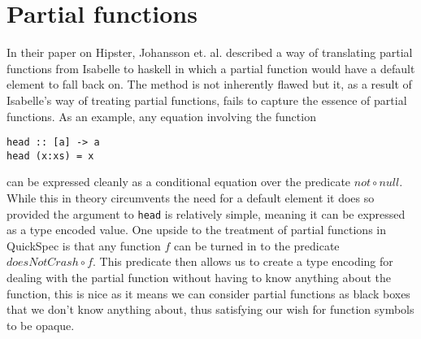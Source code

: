 \section{Partial functions}
In their paper on Hipster, Johansson et. al. \cite{Johansson2014}
described a way of translating partial functions from
Isabelle to haskell in which a partial function would
have a default element to fall back on. The method is
not inherently flawed but it, as a result of Isabelle's
way of treating partial functions,
fails to capture the essence of partial functions.
As an example, any equation involving the function
\begin{verbatim}head :: [a] -> a
head (x:xs) = x
\end{verbatim}
can be expressed cleanly as a conditional equation
over the predicate $not\circ null$.
While this in theory circumvents the need for
a default element it does so provided the
argument to \texttt{head} is relatively simple,
meaning it can be expressed as a type encoded value.
One upside to the treatment of partial functions in QuickSpec
is that any function $f$ can be turned in to the predicate
$doesNotCrash \circ f$. This predicate then allows us to create
a type encoding for dealing with the partial function without
having to know anything about the function, this is nice as it means
we can consider partial functions as black boxes that we don't know
anything about, thus satisfying our wish for function symbols to be opaque.
